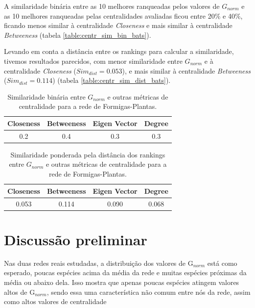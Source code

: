 \documentclass[
  12pt,
]{article}
\begin{document}
A similaridade binária entre as 10 melhores ranqueadas pelos valores de
\(G_{norm}\) e as 10 melhores ranqueadas pelas centralidades avaliadas
ficou entre 20\% e 40\%, ficando menos similar à centralidade
\textit{Closeness} e mais similar à centralidade \textit{Betweeness}
(tabela \ref{table:centr_sim_bin_bats}).

Levando em conta a distância entre os rankings para calcular a
similaridade, tivemos resultados parecidos, com menor similaridade entre
\(G_{norm}\) e à centralidade \textit{Closeness}
(\(Sim_{dist} = 0.053\)), e mais similar à centralidade
\textit{Betweeness} (\(Sim_{dist} = 0.114\)) (tabela
\ref{table:centr_sim_dist_bats}).

\begin{table}[!ht]
\caption{Similaridade binária entre $G_{norm}$ e outras métricas de centralidade para a rede de Formigas-Plantas.}\label{table:centr_sim_bin_ants}
\centering
\begin{tabular}{cccc}
\hline
Closeness & Betweeness & Eigen Vector & Degree\\
\hline
\hline
0.2 & 0.4 & 0.3 & 0.3\\
\hline
\end{tabular}
\end{table}

\begin{table}[!ht]
\caption{Similaridade ponderada pela distância dos rankings entre $G_{norm}$ e outras métricas de centralidade para a rede de Formigas-Plantas.}\label{table:centr_sim_dist_ants}
\centering
\begin{tabular}{cccc}
\hline
Closeness & Betweeness & Eigen Vector & Degree \\
\hline
\hline
0.053 & 0.114 & 0.090 & 0.068\\
\hline
\end{tabular}
\end{table}

\pagebreak

\hypertarget{discussuxe3o-preliminar}{%
\section{Discussão preliminar}\label{discussuxe3o-preliminar}}

Nas duas redes reais estudadas, a distribuição dos valores de
G\(_{norm}\) está como esperado, poucas espécies acima da média da rede
e muitas espécies próximas da média ou abaixo dela. Isso mostra que
apenas poucas espécies atingem valores altos de G\(_{norm}\), sendo essa
uma característica não comum entre nós da rede, assim como altos valores
de centralidade
\end{document}
